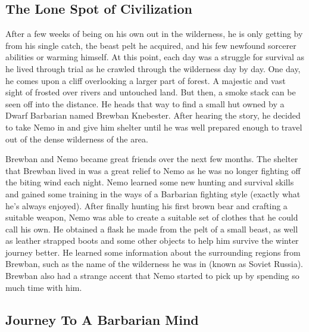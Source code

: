 \documentclass[letterpaper,10pt,twoside,twocolumn,openany]{book}
\begin{document}
\subsection{The Lone Spot of Civilization}

After a few weeks of being on his own out in the wilderness, he is only getting by from his single catch, the beast pelt he acquired, and his few newfound sorcerer abilities or warming himself. At this point, each day was a struggle for survival as he lived through trial as he crawled through the wilderness day by day. One day, he comes upon a cliff overlooking a larger part of forest. A majestic and vast sight of frosted over rivers and untouched land. But then, a smoke stack can be seen off into the distance. He heads that way to find a small hut owned by a Dwarf Barbarian named Brewban Knebester. After hearing the story, he decided to take Nemo in and give him shelter until he was well prepared enough to travel out of the dense wilderness of the area. 

Brewban and Nemo became great friends over the next few months. The shelter that Brewban lived in was a great relief to Nemo as he was no longer fighting off the biting wind each night. Nemo learned some new hunting and survival skills and gained some training in the ways of a Barbarian fighting style (exactly what he's always enjoyed). After finally hunting his first brown bear and crafting a suitable weapon, Nemo was able to create a suitable set of clothes that he could call his own. He obtained a flask he made from the pelt of a small beast, as well as leather strapped boots and some other objects to help him survive the winter journey better. He learned some information about the surrounding regions from Brewban, such as the name of the wilderness he was in (known as Soviet Russia). Brewban also had a strange accent that Nemo started to pick up by spending so much time with him.

\subsection{Journey To A Barbarian Mind}
\end{document}
